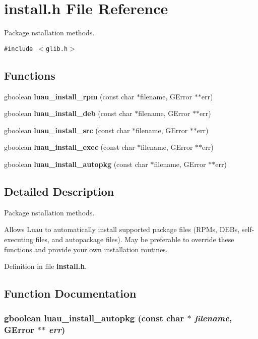 \section{install.h File Reference}
\label{install_8h}
Package nstallation methods.  


{\tt \#include $<$glib.h$>$}\par
\subsection*{Functions}
\begin{CompactItemize}
\item 
gboolean {\bf luau\_\-install\_\-rpm} (const char $\ast$filename, GError $\ast$$\ast$err)
\item 
gboolean {\bf luau\_\-install\_\-deb} (const char $\ast$filename, GError $\ast$$\ast$err)
\item 
gboolean {\bf luau\_\-install\_\-src} (const char $\ast$filename, GError $\ast$$\ast$err)
\item 
gboolean {\bf luau\_\-install\_\-exec} (const char $\ast$filename, GError $\ast$$\ast$err)
\item 
gboolean {\bf luau\_\-install\_\-autopkg} (const char $\ast$filename, GError $\ast$$\ast$err)
\end{CompactItemize}


\subsection{Detailed Description}
Package nstallation methods. 

Allows Luau to automatically install supported package files (RPMs, DEBs, self-executing files, and autopackage files). May be preferable to override these functions and provide your own installation routines.

Definition in file {\bf install.h}.

\subsection{Function Documentation}
\subsubsection{\setlength{\rightskip}{0pt plus 5cm}gboolean luau\_\-install\_\-autopkg (const char $\ast$ {\em filename}, GError $\ast$$\ast$ {\em err})}\label{install_8h_a4}




